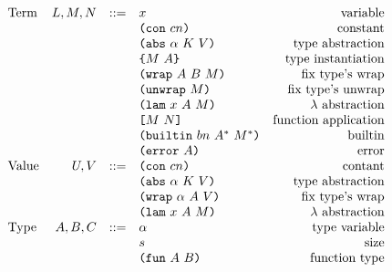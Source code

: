 \documentclass[../main.tex]{subfiles}
\begin{document}
\begin{figure*}[t]
    \centering
    \[\begin{array}{lrclr}
        \textrm{Term}             & L,M,N  & ::= & x                          & \textrm{variable}\\
                                  &        &     & \texttt{(} \texttt{con} ~ cn \texttt{)}                   & \textrm{constant}\\
                                  &        &     & \texttt{(} \texttt{abs} ~ \alpha ~ K ~ V \texttt{)}         & \textrm{type abstraction}\\
                                  &        &     & \texttt{\{}M ~ A\texttt{\}}                & \textrm{type instantiation}\\
                                  &        &     & \texttt{(} \texttt{wrap} ~ A ~ B ~ M \texttt{)}             & \textrm{fix type's wrap}\\
                                  &        &     & \texttt{(} \texttt{unwrap} ~ M \texttt{)}                 & \textrm{fix type's unwrap}\\
                                  &        &     & \texttt{(} \texttt{lam} ~ x ~ A ~ M \texttt{)}              & \textrm{$\lambda$ abstraction}\\
                                  &        &     & \texttt{[} M ~ N \texttt{]}                 & \textrm{function application}\\
                                  &        &     & \texttt{(} \texttt{builtin} ~ bn ~ A^* ~ M^* \texttt{)}     & \textrm{builtin}\\
                                  &        &     & \texttt{(} \texttt{error} ~ A \texttt{)}                  & \textrm{error}\\
        \textrm{Value}            & U, V   & ::= & \texttt{(} \texttt{con} ~ cn \texttt{)}                   & \textrm{contant}\\
                                  &        &     & \texttt{(} \texttt{abs} ~ \alpha ~ K ~ V \texttt{)}         & \textrm{type abstraction}\\
                                  &        &     & \texttt{(} \texttt{wrap} ~ \alpha ~ A ~ V \texttt{)}        & \textrm{fix type's wrap}\\
                                  &        &     & \texttt{(} \texttt{lam} ~ x ~ A ~ M \texttt{)}              & \textrm{$\lambda$ abstraction}\\
        \textrm{Type}             & A,B,C  & ::= & \alpha                     & \textrm{type variable}\\
                                  &        &     & s                          & \textrm{size}\\
                                  &        &     & \texttt{(} \texttt{fun} ~ A ~ B \texttt{)}                & \textrm{function type}\\

\end{array}\]
\end{figure*}
\end{document}
